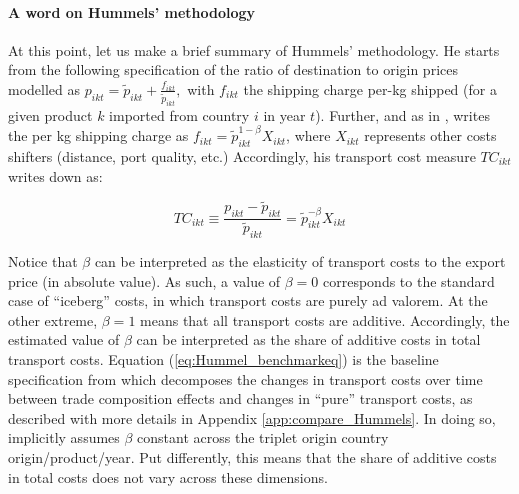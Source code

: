 \documentclass[a4paper,11pt]{article}
\begin{document}
\paragraph{A word on Hummels' methodology} At this point, let us make a brief summary of Hummels' methodology\nocite{hummels2007}.
He starts from the following specification of the ratio of destination to origin prices modelled as $p_{ikt} = \widetilde{p}_{ikt}+\frac{f_{ikt}}{ \widetilde{p}_{ikt}},$ with $f_{ikt}$ the shipping charge per-kg shipped (for a given product $k$ imported from country $i$ in year $t$).
Further, and as in \cite{hummels_skiba}, \cite{hummels2007} writes the per kg shipping charge as $f_{ikt}=\widetilde{p}_{ikt}^{1-\beta}X_{ikt}$, where $X_{ikt}$ represents other costs shifters (distance, port quality, etc.) Accordingly, his transport cost measure $TC_{ikt}$ writes down as:

\begin{equation}
TC_{ikt}\equiv \frac{p_{ikt}-\widetilde{p}_{ikt}}{\widetilde{p}_{ikt}} = \widetilde{p}_{ikt}^{-\beta}X_{ikt} \label{eq:Hummel_benchmarkeq}
\end{equation}

Notice that $\beta$ can be interpreted as the elasticity of transport costs to the export price (in absolute value).
As such, a value of $\beta = 0$ corresponds to the standard case of ``iceberg'' costs, in which transport costs are purely ad valorem.
At the other extreme, $\beta = 1$ means that all transport costs are additive.
Accordingly, the estimated value of $\beta$ can be interpreted as the share of additive costs in total transport costs.
Equation (\ref{eq:Hummel_benchmarkeq}) is the baseline specification from which \cite{hummels2007} decomposes the changes in transport costs over time between trade composition effects and changes in ``pure'' transport costs, as described with more details in Appendix \ref{app:compare_Hummels}.
In doing so, \cite{hummels2007} implicitly assumes $\beta$ constant across the triplet origin country origin/product/year.
Put differently, this means that the share of additive costs in total costs does not vary across these dimensions.
\end{document}
